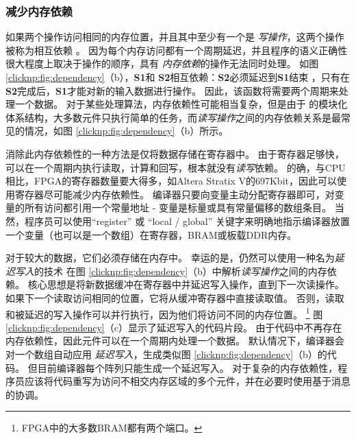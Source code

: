 \subsubsection{减少内存依赖}


如果两个操作访问相同的内存位置，并且其中至少有一个是 \textit {写操作}，这两个操作被称为相互依赖 \cite {dependence}。
因为每个内存访问都有一个周期延迟，并且程序的语义正确性很大程度上取决于操作的顺序，具有 \textit {内存依赖}的操作无法同时处理。
如图 \ref {clicknp:fig:dependency}（b），\textbf {S1}和 \textbf {S2}相互依赖：\textbf {S2}必须延迟到\textbf {S1}结束 ，只有在\textbf {S2}完成后，\textbf {S1}才能对新的输入数据进行操作。
因此，该函数将需要两个周期来处理一个数据。
对于某些处理算法，内存依赖性可能相当复杂，但是由于 \name 的模块化体系结构，大多数元件只执行简单的任务，而\textit {读写操作}之间的内存依赖关系是最常见的情况，如图 \ref{clicknp:fig:dependency}（b）所示。

消除此内存依赖性的一种方法是仅将数据存储在寄存器中。
由于寄存器足够快，可以在一个周期内执行读取，计算和回写，根本就没有\textit {读写}依赖。
的确，与CPU相比，FPGA的寄存器数量要大得多，如Altera Stratix V的697Kbit，因此可以使用寄存器尽可能减少内存依赖性。
\name 编译器只要向变量主动分配寄存器即可，对变量的所有访问都引用一个常量地址 - 变量是标量或具有常量偏移的数组条目。
当然，程序员可以使用``register'' 或 ``local / global'' 关键字来明确地指示编译器放置一个变量（也可以是一个数组）在寄存器，BRAM或板载DDR内存。

对于较大的数据，它们必须存储在内存中。
幸运的是，仍然可以使用一种名为\textit {延迟写入}的技术
在图 \ref {clicknp:fig:dependency}（b）中解析\textit {读写操作}之间的内存依赖。
核心思想是将新数据缓冲在寄存器中并延迟写入操作，直到下一次读操作。
如果下一个读取访问相同的位置，它将从缓冲寄存器中直接读取值。
否则，读取和被延迟的写入操作可以并行执行，因为他们将访问不同的内存位置。
\footnote{FPGA中的大多数BRAM都有两个端口。}
图 \ref {clicknp:fig:dependency}（c）显示了延迟写入的代码片段。
由于代码中不再存在内存依赖性，因此元件可以在一个周期内处理一个数据。
默认情况下，\name 编译器会对一个数组自动应用 \textit {延迟写入}，生成类似图 \ref {clicknp:fig:dependency}（b）的代码。
但目前编译器每个阵列只能生成一个延迟写入。
对于复杂的内存依赖性，程序员应该将代码重写为访问不相交内存区域的多个元件，并在必要时使用基于消息的协调。


